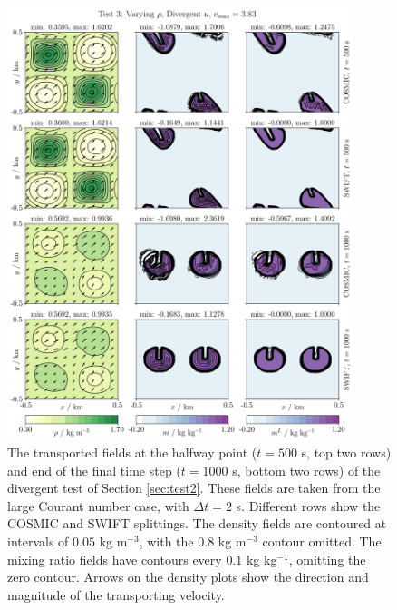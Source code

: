 \documentclass[11pt,a4paper]{article}
\begin{document}
\begin{figure}[ht!]
\centering
\includegraphics[width=0.9\textwidth]{fig_5_divergent.jpg}
\caption{The transported fields at the halfway point ($t=500$ s, top two rows) and end of the final time step ($t=1000$ s, bottom two rows) of the divergent test of Section \ref{sec:test2}. These fields are taken from the large Courant number case, with $\Delta t=2$ s. Different rows show the COSMIC and SWIFT splittings.
The density fields are contoured at intervals of $0.05$ kg m$^{-3}$, with the $0.8$ kg m$^{-3}$ contour omitted.
The mixing ratio fields have contours every $0.1$ kg kg$^{-1}$, omitting the zero contour.
Arrows on the density plots show the direction and magnitude of the transporting velocity.}\label{fig:test3}
\end{figure} \\
\end{document}
